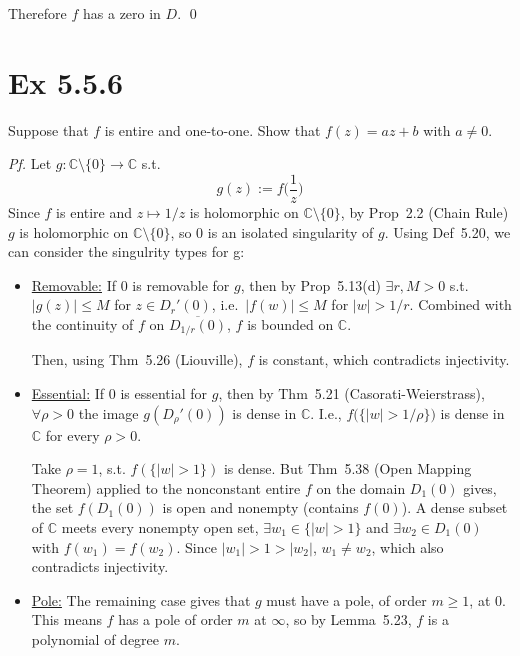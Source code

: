 \documentclass[a4paper]{article}
\begin{document}
Therefore $f$ has a zero in $D$. \qed
\newpage
\section*{Ex 5.5.6}

\begin{tcolorbox}[colback=gray!10, colframe=black, boxrule=0.5pt, arc=2mm]
Suppose that $f$ is entire and one-to-one. Show that $f(z) = az + b$ with $a \neq 0$.
\end{tcolorbox}

\textit{Pf.} Let $g : \mathbb{C} \setminus \{0\} \to \mathbb{C}$ s.t. 
\[
g(z) := f\big(\frac{1}{z}\big)
\]
Since $f$ is entire and $z \mapsto 1/z$ is holomorphic on $\mathbb{C} \setminus \{0\}$, by Prop~2.2 (Chain Rule) $g$ is holomorphic on $\mathbb{C} \setminus \{0\}$, so $0$ is an isolated singularity of $g$. Using Def~5.20, we can consider the singulrity types for g:

\begin{itemize}
\item \underline{Removable:} If $0$ is removable for $g$, then by Prop~5.13(d) $\exists r, M > 0$ s.t. $|g(z)| \leq M$ for $z \in D_r'(0)$, i.e.\ $|f(w)| \leq M$ for $|w| > 1/r$. Combined with the continuity of $f$ on $\overline{D_{1/r}(0)}$, $f$ is bounded on $\mathbb{C}$. 

Then, using Thm~5.26 (Liouville), $f$ is constant, which contradicts injectivity.

\item \underline{Essential:} If $0$ is essential for $g$, then by Thm~5.21 (Casorati-Weierstrass), $\forall \rho > 0$ the image $g(D_\rho'(0))$ is dense in $\mathbb{C}$. I.e., $f\big(\{|w| > 1/\rho\}\big)$ is dense in $\mathbb{C}$ for every $\rho > 0$.

Take $\rho = 1$, s.t. $f(\{|w| > 1\})$ is dense. But Thm~5.38 (Open Mapping Theorem) applied to the nonconstant entire $f$ on the domain $D_1(0)$ gives, the set $f(D_1(0))$ is open and nonempty (contains $f(0)$). A dense subset of $\mathbb{C}$ meets every nonempty open set, $\exists w_1 \in \{|w| > 1\}$ and $\exists w_2 \in D_1(0)$ with $f(w_1) = f(w_2)$. Since $|w_1| > 1 > |w_2|$, $w_1 \neq w_2$, which also contradicts injectivity.

\item \underline{Pole:} The remaining case gives that $g$ must have a pole, of order $m \geq 1$, at $0$. This means $f$ has a pole of order $m$ at $\infty$, so by Lemma~5.23, $f$ is a polynomial of degree $m$.
\end{itemize}
\end{document}
